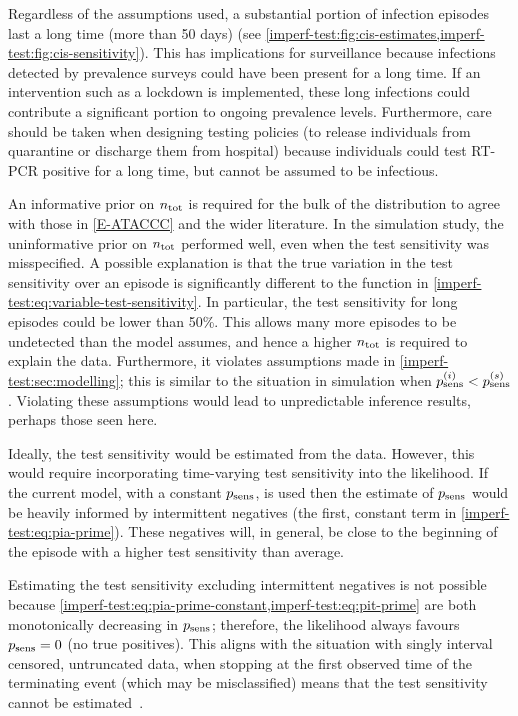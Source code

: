 \documentclass[thesis.tex]{subfiles}
\begin{document}
Regardless of the assumptions used, a substantial portion of infection episodes last a long time (\eg more than 50 days) (see \cref{imperf-test:fig:cis-estimates,imperf-test:fig:cis-sensitivity}).
This has implications for surveillance because infections detected by prevalence surveys could have been present for a long time.
If an intervention such as a lockdown is implemented, these long infections could contribute a significant portion to ongoing prevalence levels.
Furthermore, care should be taken when designing testing policies (\eg to release individuals from quarantine or discharge them from hospital) because individuals could test RT-PCR positive for a long time, but cannot be assumed to be infectious.

An informative prior on $n_\text{tot}$ is required for the bulk of the distribution to agree with those in \cref{E-ATACCC} and the wider literature.
In the simulation study, the uninformative prior on $n_\text{tot}$ performed well, even when the test sensitivity was misspecified.
A possible explanation is that the true variation in the test sensitivity over an episode is significantly different to the function in \cref{imperf-test:eq:variable-test-sensitivity}.
In particular, the test sensitivity for long episodes could be lower than 50\%.
This allows many more episodes to be undetected than the model assumes, and hence a higher $n_\text{tot}$ is required to explain the data.
Furthermore, it violates assumptions made in \cref{imperf-test:sec:modelling}; this is similar to the situation in simulation when $p_\text{sens}^{(i)} < p_\text{sens}^{(s)}$.
Violating these assumptions would lead to unpredictable inference results, perhaps those seen here.

Ideally, the test sensitivity would be estimated from the data.
However, this would require incorporating time-varying test sensitivity into the likelihood.
If the current model, with a constant $p_\text{sens}$, is used then the estimate of $p_\text{sens}$ would be heavily informed by intermittent negatives (the first, constant term in \cref{imperf-test:eq:pia-prime}).
These negatives will, in general, be close to the beginning of the episode with a higher test sensitivity than average.

Estimating the test sensitivity excluding intermittent negatives is not possible because \cref{imperf-test:eq:pia-prime-constant,imperf-test:eq:pit-prime} are both monotonically decreasing in $p_\text{sens}$; therefore, the likelihood always favours $p_\text{sens} = 0$ (\ie no true positives).
This aligns with the situation with singly interval censored, untruncated data, when stopping at the first observed time of the terminating event (which may be misclassified) means that the test sensitivity cannot be estimated~\autocite[e.g.][]{titmanMisclassify}.
\end{document}
